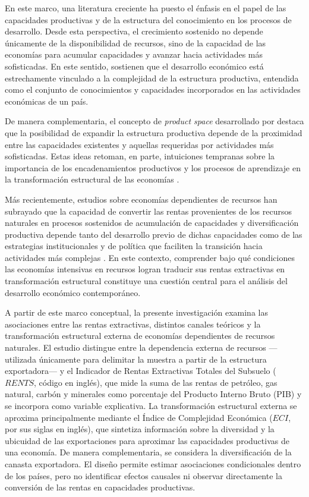 \documentclass[../../TFM.tex]{subfiles}
\begin{document}
	En este marco, una literatura creciente ha puesto el énfasis en el papel de las capacidades productivas y de la estructura del conocimiento en los procesos de desarrollo. Desde esta perspectiva, el crecimiento sostenido no depende únicamente de la disponibilidad de recursos, sino de la capacidad de las economías para acumular capacidades y avanzar hacia actividades más sofisticadas. En este sentido, \textcite{Hausmann2014} sostienen que el desarrollo económico está estrechamente vinculado a la complejidad de la estructura productiva, entendida como el conjunto de conocimientos y capacidades incorporados en las actividades económicas de un país.

	De manera complementaria, el concepto de \textit{product space} desarrollado por \textcite{Hausmann2007} destaca que la posibilidad de expandir la estructura productiva depende de la proximidad entre las capacidades existentes y aquellas requeridas por actividades más sofisticadas. Estas ideas retoman, en parte, intuiciones tempranas sobre la importancia de los encadenamientos productivos y los procesos de aprendizaje en la transformación estructural de las economías \parencite{Hirschman1958}.

	Más recientemente, estudios sobre economías dependientes de recursos han subrayado que la capacidad de convertir las rentas provenientes de los recursos naturales en procesos sostenidos de acumulación de capacidades y diversificación productiva depende tanto del desarrollo previo de dichas capacidades como de las estrategias institucionales y de política que faciliten la transición hacia actividades más complejas \parencite{Lebdioui2019}. En este contexto, comprender bajo qué condiciones las economías intensivas en recursos logran traducir sus rentas extractivas en transformación estructural constituye una cuestión central para el análisis del desarrollo económico contemporáneo.

	A partir de este marco conceptual, la presente investigación examina las
	asociaciones entre las rentas extractivas, distintos canales teóricos y la
	transformación estructural externa de economías dependientes de recursos
	naturales. El estudio distingue entre la dependencia externa de recursos
	---utilizada únicamente para delimitar la muestra a partir de la estructura
	exportadora--- y el Indicador de Rentas Extractivas Totales del Subsuelo ($RENTS$, código en inglés),
	que mide la suma de las rentas de petróleo, gas natural, carbón y minerales
	como porcentaje del Producto Interno Bruto (PIB) y se incorpora como variable
	explicativa. La transformación estructural externa
	se aproxima principalmente mediante el Índice de Complejidad Económica
	($ECI$, por sus siglas en inglés), que sintetiza información sobre la diversidad
	y la ubicuidad de las exportaciones para aproximar las capacidades productivas
	de una economía. De manera complementaria, se considera la diversificación
	de la canasta exportadora. El
	diseño permite estimar asociaciones condicionales dentro de los países, pero
	no identificar efectos causales ni observar directamente la conversión de las
	rentas en capacidades productivas.
\end{document}
